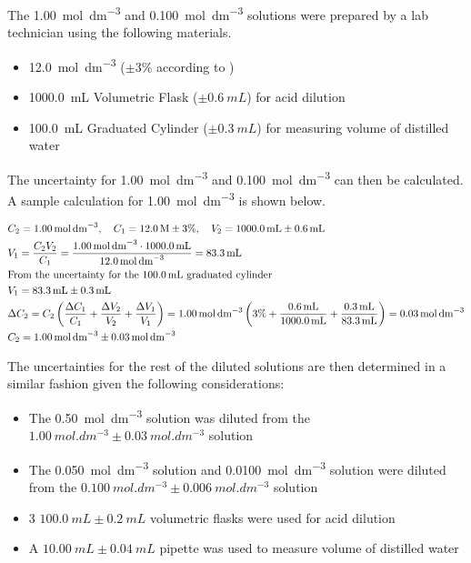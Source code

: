 \documentclass[11pt, letterpaper]{article}
\begin{document}
The \SI{1.00}{mol.dm^{-3}}  and \SI{0.100}{mol.dm^{-3}} 
solutions were prepared by a lab technician using the following
materials.

\begin{itemize}
    \item \SI{12.0}{mol.dm^{-3}}  (\(\pm 3\%\) according to \cite{HydrochloricAcidConcentrate})
    \item \SI{1000.0}{mL} Volumetric Flask (\(\pm \SI{0.6}{mL}\)) for acid dilution
    \item \SI{100.0}{mL} Graduated Cylinder (\(\pm \SI{0.3}{mL}\)) for measuring volume of distilled water
\end{itemize}

The uncertainty for \SI{1.00}{mol.dm^{-3}}  and \SI{0.100}{mol.dm^{-3}}
can then be calculated. A sample calculation for \SI{1.00}{mol.dm^{-3}} 
is shown below.

\begingroup
\allowdisplaybreaks
\begin{align*}
     & C_2 = \SI{1.00}{mol.dm^{-3}},\quad C_1 = \SI{12.0}{M} \pm 3\%,\quad V_2 = \SI{1000.0}{mL} \pm \SI{0.6}{mL}
    \\
     & V_1 = \frac{C_2V_2}{C_1} = \frac{\SI{1.00}{mol.dm^{-3}} \cdot \SI{1000.0}{mL}}{\SI{12.0}{mol.dm^{-3}}}
    = \SI{83.3}{mL}
    \\
     & \text{From the uncertainty for the \SI{100.0}{mL} graduated cylinder}
    \\
     & V_1 = \SI{83.3}{mL} \pm \SI{0.3}{mL}
    \\
     & \Delta C_2 = C_2 \left( \frac{\Delta C_1}{C_1} + \frac{\Delta V_2}{V_2} + \frac{\Delta V_1}{V_1} \right)
    = \SI{1.00}{mol.dm^{-3}} \left( 3\% + \frac{\SI{0.6}{mL}}{\SI{1000.0}{mL}} + \frac{\SI{0.3}{mL}}{\SI{83.3}{mL}} \right)
    = \SI{0.03}{mol.dm^{-3}}
    \\
     & C_2 = \SI{1.00}{mol.dm^{-3}} \pm \SI{0.03}{mol.dm^{-3}}
\end{align*}
\endgroup

The uncertainties for the rest of the diluted solutions are then determined
in a similar fashion given the following considerations:

\begin{itemize}
    \item The \SI{0.50}{mol.dm^{-3}}  solution was diluted from the \(\SI{1.00}{mol.dm^{-3}} \pm \SI{0.03}{mol.dm^{-3}}\)  solution
    \item The \SI{0.050}{mol.dm^{-3}}  solution and \SI{0.0100}{mol.dm^{-3}}  solution were diluted from the \(\SI{0.100}{mol.dm^{-3}} \pm \SI{0.006}{mol.dm^{-3}}\)  solution
    \item 3 \(\SI{100.0}{mL} \pm \SI{0.2}{mL}\) volumetric flasks were used for acid dilution
    \item A \(\SI{10.00}{mL} \pm \SI{0.04}{mL}\) pipette was used to measure volume of distilled water
\end{itemize}
\end{document}

